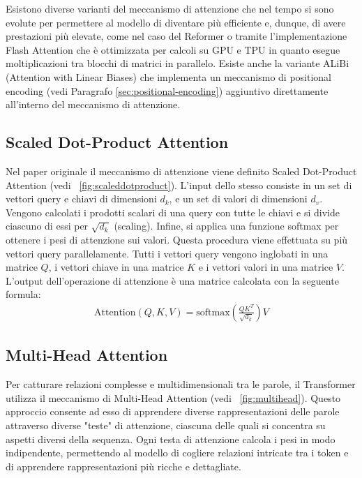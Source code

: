 Esistono diverse varianti del meccanismo di attenzione che nel tempo si sono evolute per permettere al modello di diventare più efficiente e, dunque, di avere prestazioni più elevate, come nel caso del Reformer \cite{kitaev2020reformerefficienttransformer} o tramite l'implementazione Flash Attention \cite{dao2022flashattentionfastmemoryefficientexact} che è ottimizzata per calcoli su GPU e TPU in quanto esegue moltiplicazioni tra blocchi di matrici in parallelo. Esiste anche la variante ALiBi (Attention with Linear Biases) \cite{press2022trainshorttestlong} che implementa un meccanismo di positional encoding (vedi Paragrafo \ref{sec:positional-encoding}) aggiuntivo direttamente all'interno del meccanismo di attenzione.

\subsection{Scaled Dot-Product Attention}
Nel paper originale il meccanismo di attenzione viene definito Scaled Dot-Product Attention (vedi \figurename{~\ref{fig:scaleddotproduct}}). L'input dello stesso consiste in un set di vettori query e chiavi di dimensioni \(d_k\), e un set di valori di dimensioni \(d_v\). Vengono calcolati i prodotti scalari di una query con tutte le chiavi e si divide ciascuno di essi per \(\sqrt{d_k}\) (scaling). Infine, si applica una funzione softmax per ottenere i pesi di attenzione sui valori.
Questa procedura viene effettuata su più vettori query parallelamente. Tutti i vettori query vengono inglobati in una matrice \(Q\), i vettori chiave in una matrice \(K\) e i vettori valori in una matrice \(V\). L'output dell'operazione di attenzione è una matrice calcolata con la seguente formula:
\begin{align}
	\text{Attention}(Q, K, V) = \text{softmax}\left(\frac{QK^T}{\sqrt{d_k}}\right)V
\end{align}

\subsection{Multi-Head Attention}
Per catturare relazioni complesse e multidimensionali tra le parole, il Transformer utilizza il meccanismo di Multi-Head Attention (vedi \figurename{~\ref{fig:multihead}}). Questo approccio consente ad esso di apprendere diverse rappresentazioni delle parole attraverso diverse "teste" di attenzione, ciascuna delle quali si concentra su aspetti diversi della sequenza. Ogni testa di attenzione calcola i pesi in modo indipendente, permettendo al modello di cogliere relazioni intricate tra i token e di apprendere rappresentazioni più ricche e dettagliate.


